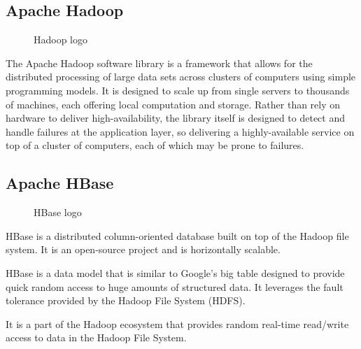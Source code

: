 \documentclass[oneside,a4paper,12pt]{report}
\begin{document}
{ \subsection{Apache Hadoop}
 \begin{figure}[h]
 	\begin{center}
 	\end{center}
 	\caption{Hadoop logo}
 \end{figure} 
 The Apache Hadoop software library is a framework that allows for the distributed processing of large data sets across clusters of computers using simple programming models. It is designed to scale up from single servers to thousands of machines, each offering local computation and storage. Rather than rely on hardware to deliver high-availability, the library itself is designed to detect and handle failures at the application layer, so delivering a highly-available service on top of a cluster of computers, each of which may be prone to failures.

\subsection{Apache HBase}
 \begin{figure}[H]
 	\begin{center}
 	\end{center}
 	\caption{HBase logo}
 \end{figure} 
HBase is a distributed column-oriented database built on top of the Hadoop file system. It is an open-source project and is horizontally scalable.

HBase is a data model that is similar to Google’s big table designed to provide quick random access to huge amounts of structured data. It leverages the fault tolerance provided by the Hadoop File System (HDFS).

It is a part of the Hadoop ecosystem that provides random real-time read/write access to data in the Hadoop File System.

}
\end{document}
